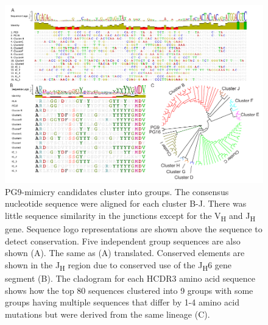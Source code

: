 \begin{figure}[!t]
   \centering
   \includegraphics[width=\linewidth]{images/chapter3/figure3_12.pdf} %
   \caption[PG9-Mimicry Candidates Cluster Into Groups]{PG9-mimicry candidates cluster into groups. The consensus nucleotide sequence were aligned for each cluster B-J. There was little sequence similarity in the junctions except for the V\textsubscript{H} and J\textsubscript{H}  gene. Sequence logo representations are shown above the sequence to detect conservation. Five independent group sequences are also shown (A). The same as (A) translated. Conserved elements are shown in the J\textsubscript{H} region due to conserved use of the J\textsubscript{H}6 gene segment (B). The cladogram for each HCDR3 amino acid sequence shows how the top 80 sequences clustered into 9 groups with some groups having multiple sequences that differ by 1-4 amino acid mutations but were derived from the same lineage (C).}
   \label{fig:figure3_12}
\end{figure}


